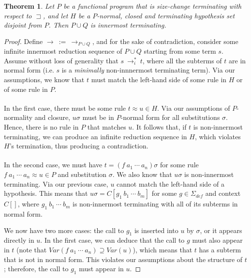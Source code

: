 \documentclass{article}
\newtheorem{theorem}{Theorem}%
\theoremstyle{definition}
\newcommand{\supterm}{\sqsupset}
\begin{document}
\begin{theorem}
    Let $P$ be a functional program that is size-change terminating with respect to $\supterm$, and let $H$ be a $P$-normal, closed and terminating hypothesis set disjoint from $P$. Then $P \cup Q$ is innermost terminating. 
\end{theorem}
\begin{proof}
    Define $\longrightarrow ~:=~ \longrightarrow_{P \cup Q}$, and for the sake of contradiction, consider some infinite innermost reduction sequence of $P \cup Q$ starting from some term $s$. Assume without loss of generality that $s ~ \longrightarrow^*_i ~ t$, where all the subterms of $t$ are in normal form (i.e. $s$ is a \textit{minimally} non-innnermost terminating term). Via our assumptions, we know that $t$ must match the left-hand side of some rule in $H$ or of some rule in $P$.
    \\~\\
    In the first case, there must be some rule $t \approx u \in H$. Via our assumptions of $P$-normality and closure, $u\sigma$ must be in $P$-normal form for all substitutions $\sigma$. Hence, there is no rule in $P$ that matches $u$. It follows that, if $t$ is non-innermost terminating, we can produce an infinite reduction sequence in $H$, which violates $H$'s termination, thus producing a contradiction.
    \\~\\
    In the second case, we must have $t = (f ~ a_1 ~ \cdots ~ a_n)\sigma$ for some rule $f ~ a_1 ~ \cdots ~ a_n \approx u \in P$ and substitution $\sigma$. We also know that $u\sigma$ is non-innermost terminating. Via our previous case, $u$ cannot match the left-hand side of a hypothesis. This means that $u\sigma = C[g_1 ~ b_1 ~ \cdots ~ b_m]$ for some $g \in \Sigma_{def}$ and context $C[]$, where $g_1 ~ b_1 ~ \cdots ~ b_m$ is non-innermost terminating with all of its subterms in normal form. 
    
    We now have two more cases: the call to $g_1$ is inserted into $u$ by $\sigma$, or it appears directly in $u$. In the first case, we can deduce that the call to $g$ must also appear in $t$ (note that $Var(f ~ a_1 ~ \cdots ~ a_n) \supseteq Var(u)$), which means that $t$ has a subterm that is not in normal form. This violates our assumptions about the structure of $t$; therefore, the call to $g_1$ must appear in $u$.


\end{proof}
\end{document}
